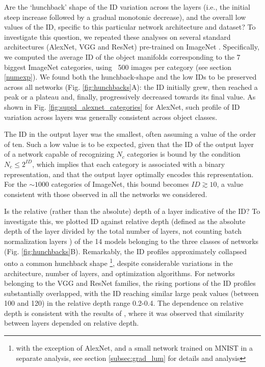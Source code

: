 \documentclass{article}
\begin{document}
Are the ‘hunchback’ shape of the ID variation across the layers (i.e., the initial steep increase followed by a gradual monotonic decrease), and the overall low values of the ID, specific to this particular network architecture and dataset? To investigate this question, we repeated these analyses on several standard architectures (AlexNet, VGG and ResNet) pre-trained on ImageNet \cite{imagenet_cvpr09}. Specifically, we computed the average ID of the object manifolds corresponding to the 7 biggest ImageNet categories, using ~500 images per category (see section \ref{numexp}). We found both the hunchback-shape and the low IDs to be preserved across all networks (Fig. \ref{fig:hunchbacks}A): the ID initially grew, then reached a peak or a plateau and, finally, progressively decreased towards its final value. As shown in Fig. \ref{fig:suppl_alexnet_categories} for AlexNet, such profile of ID variation across layers was generally consistent across object classes.

The ID in the output layer was the smallest, often assuming a value of the order of ten. Such a low value is to be expected, given that the  ID of the output layer of a network capable of recognizing $N_c$ categories is bound by the condition $N_c \le 2^{ID}$, which implies that each category is associated with a binary representation, and that the output layer optimally encodes this representation. For the $\sim 1000$ categories of ImageNet, this bound  becomes $ID \gtrsim 10$, a value consistent with those observed in all the networks we considered.

Is the relative (rather than the absolute) depth of a layer indicative of the ID? To investigate this,  we plotted ID against relative depth (defined as the absolute depth of the layer divided by the total number of layers, not counting batch normalization layers %
\cite{raghu2017svcca}) of the 14 models belonging to the three classes of networks (Fig. \ref{fig:hunchbacks}B). Remarkably, the ID profiles approximately collapsed onto a common hunchback shape \footnote{with the exception of AlexNet, and a  small network trained on MNIST in a separate analysis, see section \ref{subsec:grad_lum} for details and analysis}, despite considerable variations in the architecture, number of layers, and optimization algorithms. %
For networks belonging to the VGG and ResNet families, the rising portions of the ID profiles substantially overlapped, with the ID reaching similar large peak values (between 100 and 120) in the relative depth range 0.2-0.4. The dependence on relative depth is consistent with the results of \cite{raghu2017svcca}, where it was observed that similarity between layers depended on relative depth.
\end{document}
